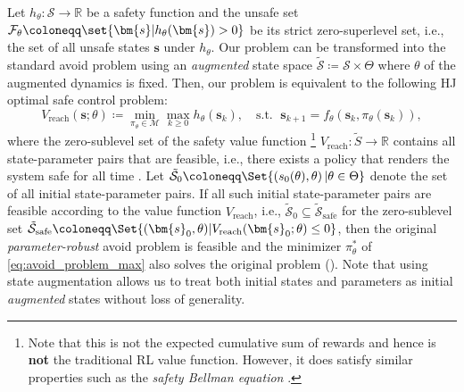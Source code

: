 \documentclass{article} %
\def\vb{{\bm{b}}}
\def\vx{{\bm{x}}}
\let\Cref\crtCref
\newcommand*{\AvoidSet}{{\mathcal{F}_\theta}}
\newcommand*{\XSet}{\mathcal{X}}
\def\vx{{\vb{x}}}
\def\vx{{\bm{s}}}
\def\XSet{{\mathcal{S}}}
\begin{document}
Let $h_\theta : \XSet \to \mathbb{R}$ be a safety function and the unsafe set $\AvoidSet \coloneqq \set{\vx | h_\theta (\vx) > 0}$ be its strict zero-superlevel set, i.e., the set of all unsafe states $\vx$ under $h_\theta$.
Our problem can be transformed into the standard avoid problem using an \textit{augmented} state space $\tilde{\XSet} \coloneqq \XSet \times \Theta$ where $\theta$ of the augmented dynamics is fixed.
Then, our problem is equivalent to the following
HJ optimal safe control
problem:
\begin{equation} \label{eq:avoid_problem_max}
    V_{\text{reach}}(\vx; \theta) \coloneqq \min_{\pi_\theta \in \mathcal{M}} \max_{k \geq 0} h_\theta(\vx_k), \quad \text{s.t.   }\; \vx_{k+1} = f_\theta(\vx_k, \pi_\theta(\vx_k)),
\end{equation}
where the zero-sublevel set of the safety value function \footnote{Note that this is not the expected cumulative sum of rewards and hence is \textbf{not} the traditional RL value function. However, it does satisfy similar properties such as the \textit{safety Bellman equation} \citep{fisac2019bridging}.} $V_{\text{reach}} : \tilde{S} \to \mathbb{R}$ contains all state-parameter pairs
that are feasible, i.e., there exists a policy that renders the system safe for all time \citep{mitchell2005time}.
Let $\tilde{\mathcal{S}}_0 \coloneqq \Set{ (s_0(\theta), \theta)\, | \theta \in \Theta }$ denote the set of all initial state-parameter pairs.
If
all such initial state-parameter pairs are feasible according to the value function $V_{\text{reach}}$, i.e.,
$\tilde{\XSet}_0 \subseteq \tilde{\XSet}_{\text{safe}}$ for the zero-sublevel set
$\tilde{\XSet}_{\text{safe}} \coloneqq \Set{ (\vx_0, \theta) | V_{\text{reach}}(\vx_0; \theta) \leq 0 }$, then the original \emph{parameter-robust} avoid problem is feasible and the minimizer $\pi_\theta^\ast$ of \eqref{eq:avoid_problem_max} also solves the original problem (\Cref{app:reachability_rl_equivalence}).
Note that using state augmentation allows us to treat both initial states and parameters as initial \textit{augmented} states without loss of generality.
\end{document}
